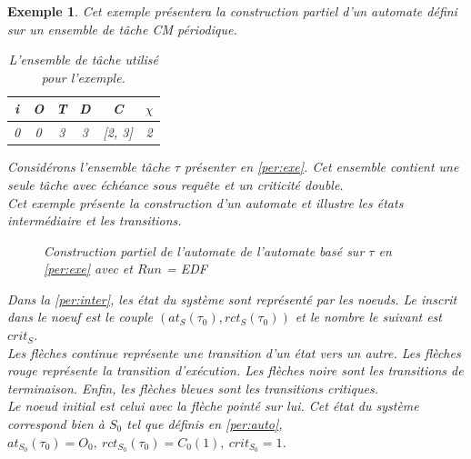 \documentclass[12pt,a4paper,oneside]{book}
\theoremstyle{break}
\newtheorem{exem}{Exemple}[chapter]
\theoremstyle{breakplain}
\begin{document}
\begin{exem}
Cet exemple présentera la construction partiel d'un automate défini sur un ensemble de tâche CM périodique.

\begin{table}[h]

    \centering

\begin{tabular}{|c|c|c|c|c|c|}
\hline
i &O & T & D & C & $\chi$\\
\hline
0 & 0 & 3 & 3 & [2, 3]& 2\\
\hline
\end{tabular}
    
\caption{L'ensemble de tâche utilisé pour l'exemple.}
\label{per:exe}

\end{table}

Considérons l'ensemble tâche $\tau$ présenter en \autoref{per:exe}. Cet ensemble contient une seule tâche avec échéance sous requête et un criticité double.\\

Cet exemple présente la construction d'un automate et illustre les états intermédiaire et les transitions.

\begin{figure}[h]

    \centering
    \def\svgwidth{\columnwidth}
    
    
\caption{Construction partiel de l'automate de l'automate basé sur $\tau$ en \autoref{per:exe} avec et $Run$ = EDF}
\label{per:inter}

\end{figure}


Dans la \autoref{per:inter}, les état du système sont représenté par les noeuds. Le inscrit dans le noeuf est le couple $(at_S(\tau_0), rct_S(\tau_0))$ et le nombre le suivant est $crit_S$.\\
Les flèches continue représente une transition d'un état vers un autre. Les flèches rouge représente la transition d'exécution. Les flèches noire sont les transitions de terminaison. Enfin, les flèches bleues sont les transitions critiques.\\

Le noeud initial est celui avec la flèche pointé sur lui. Cet état du système correspond bien à $S_0$ tel que définis en \autoref{per:auto}, $at_{S_0}(\tau_0) = O_0,\ rct_{S_0}(\tau_0) = C_0(1),\ crit_{S_0} = 1$.\\


\end{exem}
\end{document}
